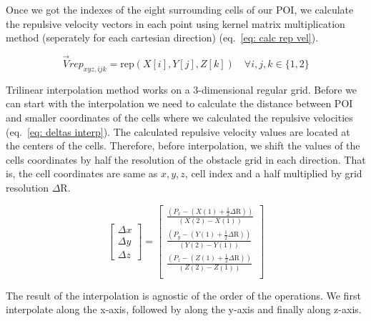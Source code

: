 \documentclass[letterpaper, 10 pt, conference]{ieeeconf}  %
\begin{document}
Once we got the indexes of the eight surrounding cells of our POI, we calculate the repulsive velocity vectors in each point using kernel matrix multiplication method (seperately for each cartesian direction) (eq.~\ref{eq: calc rep vel}).

\begin{equation}
	\label{eq: calc rep vel}
	\vec{V}rep_{xyz,ijk} = \mathrm{rep}(X[i], Y[j], Z[k]) \quad \forall i, j, k \in \{1, 2\}
\end{equation}

Trilinear interpolation method works on a 3-dimensional regular grid. Before we can start with the interpolation we need to calculate the distance between POI and smaller coordinates of the cells where we calculated the repulsive velocities (eq.~\ref{eq: deltas interp}). The calculated repulsive velocity values are located at the centers of the cells. Therefore, before interpolation, we shift the values of the cells coordinates by half the resolution of the obstacle grid in each direction. That is, the cell coordinates are same as $x,y,z$, cell index and a half multiplied by grid resolution $\Delta \mathrm{R}$.

\begin{equation}
	\label{eq: deltas interp}
	\begin{bmatrix}
		\Delta x \\
		\Delta y \\
		\Delta z		
	\end{bmatrix}
	=
	\begin{bmatrix}
		\frac{\left( P_x - \left( X(1) + \frac{1}{2} \Delta \mathrm{R} \right)  \right)}{\left( X(2) - X(1) \right)} \\
		\frac{\left( P_y - \left( Y(1) + \frac{1}{2} \Delta \mathrm{R} \right)  \right)}{\left( Y(2) - Y(1) \right)} \\
		\frac{\left( P_z - \left( Z(1) + \frac{1}{2} \Delta \mathrm{R} \right)  \right)}{\left( Z(2) - Z(1) \right)} \\
	\end{bmatrix}
\end{equation}

The result of the interpolation is agnostic of the order of the operations. We first interpolate along the x-axis, followed by along the y-axis and finally along z-axis.
	
\end{document}
